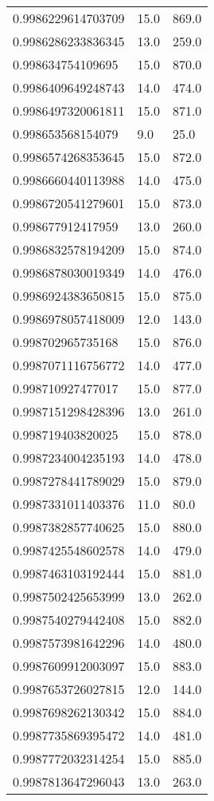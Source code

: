 \begin{center}
\begin{supertabular}[H]{p{0.30\textwidth}p{0.05\textwidth}p{0.05\textwidth}}
0.9986229614703709 & 15.0 & 869.0 \\ 
0.9986286233836345 & 13.0 & 259.0 \\ 
0.998634754109695 & 15.0 & 870.0 \\ 
0.9986409649248743 & 14.0 & 474.0 \\ 
0.9986497320061811 & 15.0 & 871.0 \\ 
0.998653568154079 & 9.0 & 25.0 \\ 
0.9986574268353645 & 15.0 & 872.0 \\ 
0.9986660440113988 & 14.0 & 475.0 \\ 
0.9986720541279601 & 15.0 & 873.0 \\ 
0.998677912417959 & 13.0 & 260.0 \\ 
0.9986832578194209 & 15.0 & 874.0 \\ 
0.9986878030019349 & 14.0 & 476.0 \\ 
0.9986924383650815 & 15.0 & 875.0 \\ 
0.9986978057418009 & 12.0 & 143.0 \\ 
0.998702965735168 & 15.0 & 876.0 \\ 
0.9987071116756772 & 14.0 & 477.0 \\ 
0.998710927477017 & 15.0 & 877.0 \\ 
0.9987151298428396 & 13.0 & 261.0 \\ 
0.998719403820025 & 15.0 & 878.0 \\ 
0.9987234004235193 & 14.0 & 478.0 \\ 
0.9987278441789029 & 15.0 & 879.0 \\ 
0.9987331011403376 & 11.0 & 80.0 \\ 
0.9987382857740625 & 15.0 & 880.0 \\ 
0.9987425548602578 & 14.0 & 479.0 \\ 
0.9987463103192444 & 15.0 & 881.0 \\ 
0.9987502425653999 & 13.0 & 262.0 \\ 
0.9987540279442408 & 15.0 & 882.0 \\ 
0.9987573981642296 & 14.0 & 480.0 \\ 
0.9987609912003097 & 15.0 & 883.0 \\ 
0.9987653726027815 & 12.0 & 144.0 \\ 
0.9987698262130342 & 15.0 & 884.0 \\ 
0.9987735869395472 & 14.0 & 481.0 \\ 
0.9987772032314254 & 15.0 & 885.0 \\ 
0.9987813647296043 & 13.0 & 263.0 \\ 

\end{supertabular}
\end{center}

